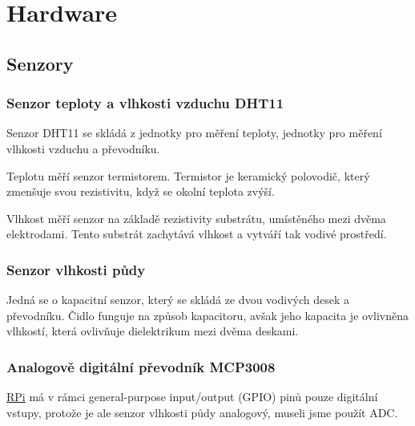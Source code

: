 \documentclass[czech,12pt,a4paper]{article}
\begin{document}
\clearpage

\section{Hardware} \label{secHardware}

\subsection{Senzory}

\subsubsection{Senzor teploty a vlhkosti vzduchu DHT11}

Senzor \ac{DHT11} se skládá z jednotky pro měření teploty, jednotky pro měření vlhkosti vzduchu a převodníku.

Teplotu měří senzor termistorem. Termistor je keramický polovodič, který zmenšuje svou rezistivitu, když se okolní teplota zvýší.

Vlhkost měří senzor na základě rezistivity substrátu, umístěného mezi dvěma elektrodami. Tento substrát zachytává vlhkost a vytváří tak vodivé prostředí.

\subsubsection{Senzor vlhkosti půdy}

Jedná se o kapacitní senzor, který se skládá ze dvou vodivých desek a převodníku. Čidlo funguje na způsob kapacitoru, avšak jeho kapacita je ovlivněna vlhkostí, která ovlivňuje dielektrikum mezi dvěma deskami.

\subsubsection{Analogově digitální převodník MCP3008} \label{secADC}

\underline{\ac{RPi}} má v rámci general-purpose input/output (GPIO) pinů pouze digitální vstupy, protože je ale senzor vlhkosti půdy analogový, museli jsme použít \ac{ADC}.
\end{document}
